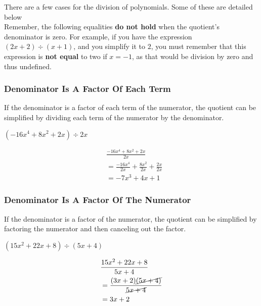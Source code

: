 \documentclass[english,course]{lecture}
\begin{document}

There are a few cases for the division of polynomials.
Some of these are detailed below\\

Remember, the following equalities \textbf{do not hold} when the quotient's denominator is zero.
For example, if you have the expression $(2x + 2) \div (x + 1)$, and you simplify it to $2$, you must remember that this expression is \textbf{not equal} to two if $x = -1$, as that would be division by zero and thus undefined.

\subsubsection{Denominator Is A Factor Of Each Term}

If the denominator is a factor of each term of the numerator,
the quotient can be simplified by dividing each term of the numerator by the denominator.

\begin{example}[Simplify]
	$(-16x^4 + 8x^2 + 2x) \div 2x$


	\begin{align*}
		  & \frac{-16x^4 + 8x^2 + 2x}{2x}                         \\
		  & = \frac{-16x^4}{2x} + \frac{8x^2}{2x} + \frac{2x}{2x} \\
		  & = -7x^3 + 4x + 1
	\end{align*}
\end{example}

\subsubsection{Denominator Is A Factor Of The Numerator}

If the denominator is a factor of the numerator, the quotient can be simplified
by factoring the numerator and then canceling out the factor.

\begin{example}[Simplify]
	$(15x^2 + 22x + 8) \div (5x + 4)$


	\begin{align*}
		  & \frac{15x^2 + 22x + 8}{5x + 4}                      \\
		  & = \frac{(3x + 2)\cancel{(5x + 4)}}{\cancel{5x + 4}} \\
		  & = 3x + 2
	\end{align*}
\end{example}
\end{document}
